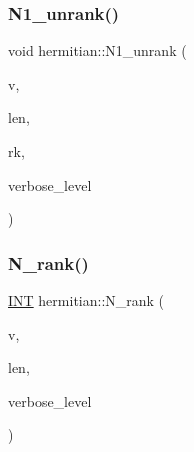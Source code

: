 \mbox{\label{classhermitian_a7c5b5487eaa9f3647f3c0930a4883dad}} 
\subsubsection{\texorpdfstring{N1\+\_\+unrank()}{N1\_unrank()}}
{\footnotesize\ttfamily void hermitian\+::\+N1\+\_\+unrank (\begin{DoxyParamCaption}\item[{\mbox{\hyperlink{galois_8h_a09fddde158a3a20bd2dcadb609de11dc}{I\+NT}} $\ast$}]{v,  }\item[{\mbox{\hyperlink{galois_8h_a09fddde158a3a20bd2dcadb609de11dc}{I\+NT}}}]{len,  }\item[{\mbox{\hyperlink{galois_8h_a09fddde158a3a20bd2dcadb609de11dc}{I\+NT}}}]{rk,  }\item[{\mbox{\hyperlink{galois_8h_a09fddde158a3a20bd2dcadb609de11dc}{I\+NT}}}]{verbose\+\_\+level }\end{DoxyParamCaption})}

\mbox{\label{classhermitian_a8c7ec85ac5e9899ebf3d5c3d58ca64da}} 
\subsubsection{\texorpdfstring{N\+\_\+rank()}{N\_rank()}}
{\footnotesize\ttfamily \mbox{\hyperlink{galois_8h_a09fddde158a3a20bd2dcadb609de11dc}{I\+NT}} hermitian\+::\+N\+\_\+rank (\begin{DoxyParamCaption}\item[{\mbox{\hyperlink{galois_8h_a09fddde158a3a20bd2dcadb609de11dc}{I\+NT}} $\ast$}]{v,  }\item[{\mbox{\hyperlink{galois_8h_a09fddde158a3a20bd2dcadb609de11dc}{I\+NT}}}]{len,  }\item[{\mbox{\hyperlink{galois_8h_a09fddde158a3a20bd2dcadb609de11dc}{I\+NT}}}]{verbose\+\_\+level }\end{DoxyParamCaption})}

\mbox{\label{classhermitian_a14b8d2fefc06ee5a6dddd22360178f78}} 

